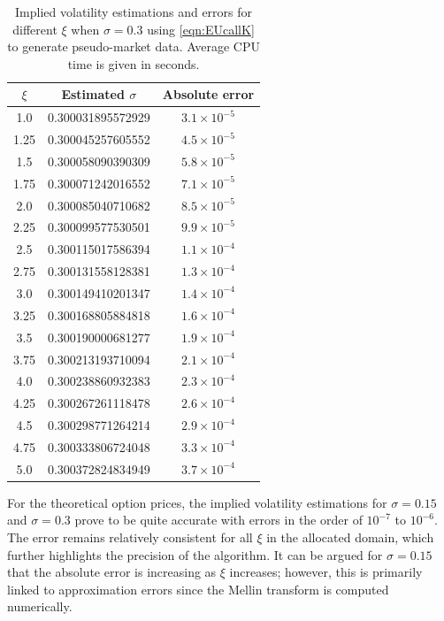\begin{table}
{\begin{tabular}{ |c|c|c| }
\hline
$\xi$ & Estimated $\sigma$ & Absolute error \\ \hline
1.0 & 0.300031895572929 & $3.1 \times 10^{-5}$ \\
1.25 & 0.300045257605552 & $4.5 \times 10^{-5}$ \\
1.5 & 0.300058090390309 & $5.8 \times 10^{-5}$ \\
1.75 & 0.300071242016552 & $ 7.1 \times 10^{-5}$ \\
2.0 & 0.300085040710682 & $8.5 \times 10^{-5}$ \\
2.25 & 0.300099577530501 & $9.9 \times 10^{-5} $ \\
2.5 & 0.300115017586394 & $1.1 \times 10^{-4}$ \\
2.75 & 0.300131558128381 & $ 1.3 \times 10^{-4} $ \\
3.0 & 0.300149410201347& $ 1.4 \times 10^{-4} $ \\
3.25 & 0.300168805884818 & $1.6 \times 10^{-4}$ \\
3.5 & 0.300190000681277 & $ 1.9 \times 10^{-4} $ \\
3.75 & 0.300213193710094 & $ 2.1 \times 10^{-4}$ \\
4.0 & 0.300238860932383 & $ 2.3 \times 10^{-4}$ \\
4.25 &0.300267261118478 & $2.6 \times 10^{-4}$ \\
4.5 & 0.300298771264214 & $ 2.9 \times 10^{-4}$ \\
4.75 & 0.300333806724048 & $3.3 \times 10^{-4}$ \\
5.0 & 0.300372824834949 & $3.7 \times 10^{-4}$ \\
\hline
\end{tabular}
\caption{Implied volatility estimations and errors for different $\xi$ when $\sigma = 0.3$ using \eqref{eqn:EUcallK} to generate pseudo-market data. Average CPU time is given in seconds.}
\label{tab:sig030Pseudo}

}
\end{table}

For the theoretical option prices, the implied volatility estimations for $\sigma = 0.15$ and $\sigma = 0.3$ prove to be quite accurate with errors in the order of $10^{-7}$ to $10^{-6}$. The error remains relatively consistent for all $\xi$ in the allocated domain, which further highlights the precision of the algorithm. It can be argued for $\sigma = 0.15$ that the absolute error is increasing as $\xi$ increases; however, this is primarily linked to approximation errors since the Mellin transform is computed numerically.

